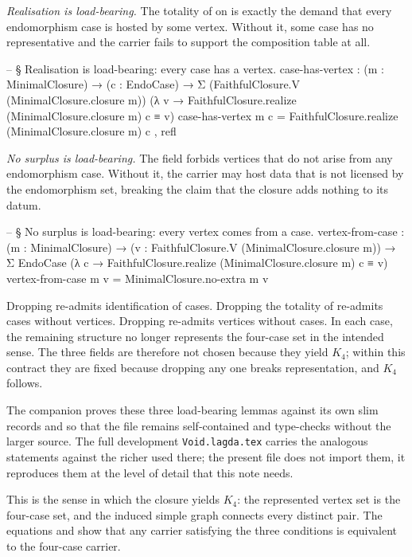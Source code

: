 \documentclass[11pt]{article}
\begin{document}
\emph{Realisation is load-bearing.}  The totality of
 on  is exactly the demand
that every endomorphism case is hosted by some vertex.  Without it,
some case has no representative and the carrier fails to support the
composition table at all.

\begin{code}
-- § Realisation is load-bearing: every case has a vertex.
case-has-vertex :
  (m : MinimalClosure) →
  (c : EndoCase) →
  Σ (FaithfulClosure.V (MinimalClosure.closure m))
    (λ v → FaithfulClosure.realize (MinimalClosure.closure m) c ≡ v)
case-has-vertex m c =
  FaithfulClosure.realize (MinimalClosure.closure m) c , refl
\end{code}

\emph{No surplus is load-bearing.}  The field 
forbids vertices that do not arise from any endomorphism case.  Without
it, the carrier may host data that is not licensed by the endomorphism
set, breaking the claim that the closure adds nothing to its datum.

\begin{code}
-- § No surplus is load-bearing: every vertex comes from a case.
vertex-from-case :
  (m : MinimalClosure) →
  (v : FaithfulClosure.V (MinimalClosure.closure m)) →
  Σ EndoCase
    (λ c → FaithfulClosure.realize (MinimalClosure.closure m) c ≡ v)
vertex-from-case m v = MinimalClosure.no-extra m v
\end{code}

Dropping  re-admits identification of
cases.  Dropping the totality of  re-admits cases
without vertices.  Dropping  re-admits vertices
without cases.  In each case, the remaining structure no longer
represents the four-case set in the intended sense.  The three
fields are therefore not chosen because they yield $K_4$; within this
contract they are fixed because dropping any one breaks representation,
and $K_4$ follows.

The companion proves these three load-bearing lemmas against its own
slim records  and 
so that the file remains self-contained and type-checks without the
larger source.  The full development \texttt{Void.lagda.tex} carries
the analogous statements against the richer  used
there; the present file does not import them, it reproduces them at
the level of detail that this note needs.

This is the sense in which the closure yields $K_4$: the represented
vertex set is the four-case set, and the induced simple graph connects every
distinct pair.  The equations  and
 show that any carrier satisfying the
three conditions is equivalent to the four-case carrier.
\end{document}
